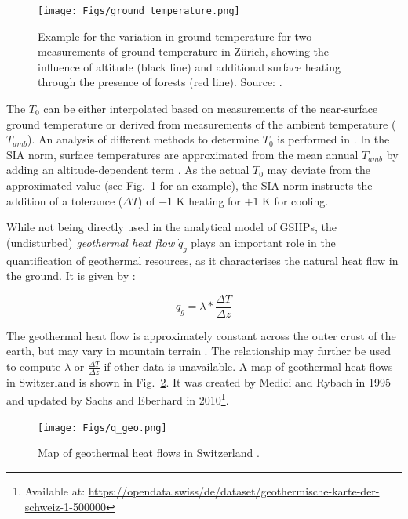 \begin{figure}
    \centering
    \texttt{[image: Figs/ground\_temperature.png]}
    \caption[Example for the variation in ground temperature for two measurements of ground temperature in Zürich.]{Example for the variation in ground temperature for two measurements of ground temperature in Zürich, showing the influence of altitude (black line) and additional surface heating through the presence of forests (red line). Source: \citet{huber_bodentemperaturen_2014}.}
    \label{fig:T_ground}
\end{figure}

The $T_0$ can be either interpolated based on measurements of the near-surface ground temperature \cite{assouline_machine_2019} or derived from measurements of the ambient temperature ($T_\mathit{amb}$). An analysis of different methods to determine $T_0$ is performed in \citep{signorelli_geoscientific_2004}. In the SIA norm, surface temperatures are  approximated from the mean annual $T_\mathit{amb}$ by adding an altitude-dependent term \cite{sia_sondes_2010}. As the actual $T_0$ may deviate from the approximated value (see Fig.~\ref{fig:T_ground} for an example), the SIA norm instructs the addition of a tolerance ($\Delta T$) of $- 1$ K heating for  $+1$ K for cooling.

While not being directly used in the analytical model of GSHPs, the (undisturbed) \textit{geothermal heat flow} $\dot{q}_{g}$ plays an important role in the quantification of geothermal resources, as it characterises the natural heat flow in the ground. It is given by \cite{huber_bodentemperaturen_2014}:

\begin{equation}
    \dot{q}_{g} = \lambda * \frac{\Delta T}{\Delta z}
\end{equation}

The geothermal heat flow is approximately constant across the outer crust of the earth, but may vary in mountain terrain \citep{huber_bodentemperaturen_2014}. The relationship may further be used to compute $\lambda$ or $ \frac{\Delta T}{\Delta z}$ if other data is unavailable. A map of geothermal heat flows in Switzerland is shown in Fig.~\ref{fig:q_geo}. It was created by Medici and Rybach in 1995 and updated by Sachs and Eberhard in 2010\footnote{Available at: \url{https://opendata.swiss/de/dataset/geothermische-karte-der-schweiz-1-500000}}.

\begin{figure}
    \centering
    \texttt{[image: Figs/q\_geo.png]}
    \caption[Map of geothermal heat flows in Switzerland]{Map of geothermal heat flows in Switzerland \citep{huber_bodentemperaturen_2014}.}
    \label{fig:q_geo}
\end{figure}


